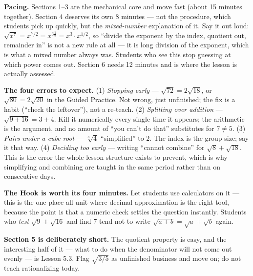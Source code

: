 \documentclass[10pt]{article}
\begin{document}
\begin{teachernote}
\textbf{Pacing.} Sections 1--3 are the mechanical core and move fast (about 15 minutes together).
Section 4 deserves its own 8 minutes --- not the procedure, which students pick up quickly, but the
\emph{mixed-number} explanation of it. Say it out loud: $\sqrt{x^7}=x^{7/2}=x^{3\frac12}
=x^3\cdot x^{1/2}$, so ``divide the exponent by the index, quotient out, remainder in'' is not a
new rule at all --- it is long division of the exponent, which is what a mixed number always was.
Students who see this stop guessing at which power comes out. Section 6 needs 12 minutes and is
where the lesson is actually assessed.

\textbf{The four errors to expect.} (1) \emph{Stopping early} --- $\sqrt{72}=2\sqrt{18}$, or
$\sqrt{80}=2\sqrt{20}$ in the Guided Practice. Not wrong, just unfinished; the fix is a habit
(``check the leftover''), not a re-teach. (2) \emph{Splitting over addition} ---
$\sqrt{9+16}=3+4$. Kill it numerically every single time it appears; the arithmetic is the
argument, and no amount of ``you can't do that'' substitutes for $7\ne5$. (3) \emph{Pairs under a
cube root} --- $\sqrt[3]{4}$ ``simplified'' to $2$. The index is the group size; say it that way.
(4) \emph{Deciding too early} --- writing ``cannot combine'' for $\sqrt8+\sqrt{18}$. This is the
error the whole lesson structure exists to prevent, which is why simplifying and combining are
taught in the same period rather than on consecutive days.

\textbf{The Hook is worth its four minutes.} Let students use calculators on it --- this is the one
place all unit where decimal approximation is the right tool, because the point is that a numeric
check settles the question instantly. Students who \emph{test} $\sqrt9+\sqrt{16}$ and find $7$ tend
not to write $\sqrt{a+b}=\sqrt a+\sqrt b$ again.

\textbf{Section 5 is deliberately short.} The quotient property is easy, and the interesting half of
it --- what to do when the denominator will not come out evenly --- is Lesson 5.3. Flag
$\sqrt{3/5}$ as unfinished business and move on; do not teach rationalizing today.
\end{teachernote}
\end{document}
